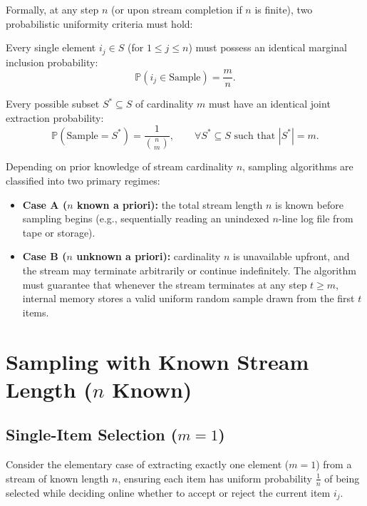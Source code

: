 Formally, at any step $n$ (or upon stream completion if $n$ is finite), two probabilistic uniformity criteria must hold:

\begin{definition}
Every single element $i_j \in S$ (for $1 \le j \le n$) must possess an identical marginal inclusion probability:
\begin{equation}
  \mathbb{P}(i_j \in \text{Sample}) = \frac{m}{n}.
  \label{eq:marginal-uniformity}
\end{equation}
\end{definition}

\begin{definition}
Every possible subset $S^* \subseteq S$ of cardinality $m$ must have an identical joint extraction probability:
\begin{equation}
  \mathbb{P}(\text{Sample} = S^*) = \frac{1}{\binom{n}{m}}, \qquad \forall S^* \subseteq S \text{ such that } |S^*| = m.
  \label{eq:joint-uniformity}
\end{equation}
\end{definition}

Depending on prior knowledge of stream cardinality $n$, sampling algorithms are classified into two primary regimes:
\begin{itemize}
  \item \textbf{Case A ($n$ known a priori):} the total stream length $n$ is known before sampling begins (e.g., sequentially reading an unindexed $n$-line log file from tape or storage).
  \item \textbf{Case B ($n$ unknown a priori):} cardinality $n$ is unavailable upfront, and the stream may terminate arbitrarily or continue indefinitely. The algorithm must guarantee that whenever the stream terminates at any step $t \ge m$, internal memory stores a valid uniform random sample drawn from the first $t$ items.
\end{itemize}

\FloatBarrier
\section{Sampling with Known Stream Length (\texorpdfstring{$n$}{n} Known)}
\label{sec:sampling-known-n}

\subsection{Single-Item Selection (\texorpdfstring{$m = 1$}{m = 1})}
Consider the elementary case of extracting exactly one element ($m = 1$) from a stream of known length $n$, ensuring each item has uniform probability $\frac{1}{n}$ of being selected while deciding online whether to accept or reject the current item $i_j$.

